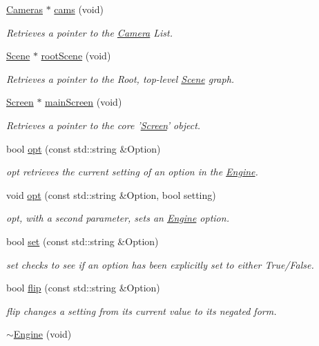 \begin{DoxyCompactItemize}
\item 
\hyperlink{class_cameras}{Cameras} $\ast$ \hyperlink{class_engine_a2b2c1cd59c9a5c903bf466284012ce4c}{cams} (void)
\begin{DoxyCompactList}\small\item\em Retrieves a pointer to the \hyperlink{class_camera}{Camera} List. \end{DoxyCompactList}\item 
\hyperlink{class_scene}{Scene} $\ast$ \hyperlink{class_engine_a782cf288c161986d0ac0eb48cd187c4d}{root\-Scene} (void)
\begin{DoxyCompactList}\small\item\em Retrieves a pointer to the Root, top-\/level \hyperlink{class_scene}{Scene} graph. \end{DoxyCompactList}\item 
\hyperlink{class_screen}{Screen} $\ast$ \hyperlink{class_engine_ad4429218b5aed162269094c6571a2520}{main\-Screen} (void)
\begin{DoxyCompactList}\small\item\em Retrieves a pointer to the core '\hyperlink{class_screen}{Screen}' object. \end{DoxyCompactList}\item 
bool \hyperlink{class_engine_ae3658976c5ab1f0c912d2c7d5747cb67}{opt} (const std\-::string \&Option)
\begin{DoxyCompactList}\small\item\em opt retrieves the current setting of an option in the \hyperlink{class_engine}{Engine}. \end{DoxyCompactList}\item 
void \hyperlink{class_engine_a797b0b934a94cd2ea7ab1c11083e425c}{opt} (const std\-::string \&Option, bool setting)
\begin{DoxyCompactList}\small\item\em opt, with a second parameter, sets an \hyperlink{class_engine}{Engine} option. \end{DoxyCompactList}\item 
bool \hyperlink{class_engine_a81f16979bc330c46675e4d7ffab5eff9}{set} (const std\-::string \&Option)
\begin{DoxyCompactList}\small\item\em set checks to see if an option has been explicitly set to either True/\-False. \end{DoxyCompactList}\item 
bool \hyperlink{class_engine_a0e6265ae2700bda2f21abd308430637a}{flip} (const std\-::string \&Option)
\begin{DoxyCompactList}\small\item\em flip changes a setting from its current value to its negated form. \end{DoxyCompactList}\item 
\hypertarget{class_engine_a4850643b0f929d8021115cf37d7ab608}{\hyperlink{class_engine_a4850643b0f929d8021115cf37d7ab608}{$\sim$\-Engine} (void)}\label{class_engine_a4850643b0f929d8021115cf37d7ab608}


\end{DoxyCompactItemize}
